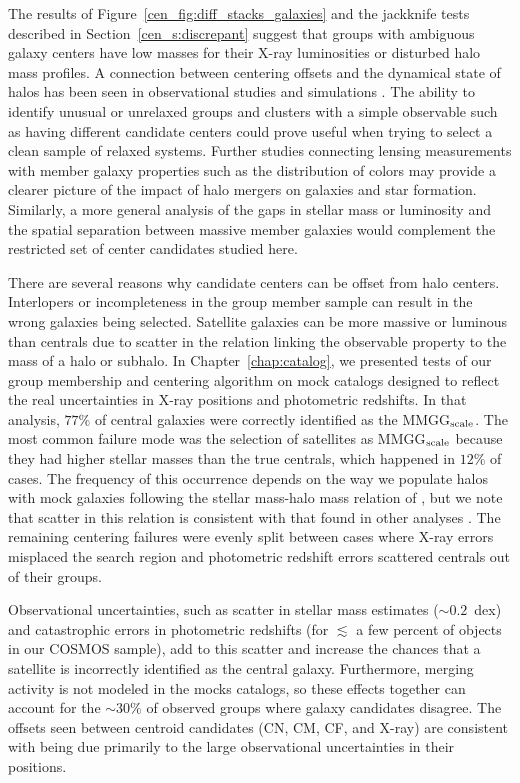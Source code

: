The results of Figure~\ref{cen_fig:diff_stacks_galaxies} and the jackknife
tests described in Section~\ref{cen_s:discrepant} suggest that groups with
ambiguous galaxy centers have low masses for their X-ray
  luminosities or disturbed halo mass profiles. A
connection between centering offsets and the dynamical state of halos
has been seen in observational studies \citep[e.g.,][]{Forman1982,
  Katayama2003, Sanderson2009} and simulations
\citep[e.g.,][]{Cohn2005, Poole2006, Maccio2007, Neto2007,
  SkibbaMaccio2011}. The ability to identify unusual
  or unrelaxed groups and
clusters with a simple observable such as having different candidate
centers could prove useful when trying to select a clean sample of
relaxed systems. Further studies connecting lensing measurements with
member galaxy properties such as the distribution of colors may
provide a clearer picture of the impact of halo mergers on galaxies
and star formation. Similarly, a more general analysis of the gaps in
stellar mass or luminosity and the spatial separation between massive
member galaxies would complement the restricted set of center
candidates studied here.

There are several reasons why candidate centers can be offset from
halo centers. Interlopers or incompleteness in the group member sample
can result in the wrong galaxies being selected. Satellite galaxies
can be more massive or luminous than centrals due to scatter in the
relation linking the observable property to the mass of a halo or
subhalo. In Chapter~\ref{chap:catalog}, we presented tests of our group membership and
centering algorithm on mock catalogs designed to reflect the real
uncertainties in X-ray positions and photometric redshifts. In that
analysis, $77\%$ of central galaxies were correctly identified as the
MMGG$_{\rm scale}$.  The most common failure mode was the selection of
satellites as MMGG$_{\rm scale}$ because they had higher stellar
masses than the true centrals, which happened in $12\%$ of
cases. The frequency of this occurrence depends on the
  way we populate halos with mock galaxies following the stellar
  mass-halo mass relation of \citet{Leauthaud2012}, but we note that
  scatter in this relation is consistent with that found in other
  analyses \citep{Yang2009, More2009, Reddick2012}. The remaining
centering failures were evenly split between cases where X-ray errors
misplaced the search region and photometric redshift errors scattered
centrals out of their groups.

Observational uncertainties, such as scatter in stellar mass estimates
($\sim0.2$~{\rm dex}) and catastrophic errors in photometric redshifts
(for $\lesssim$ a few percent of objects in our COSMOS sample), add to
this scatter and increase the chances that a satellite is incorrectly
identified as the central galaxy. Furthermore, merging activity is not
modeled in the mocks catalogs, so these effects together can account
for the $\sim30\%$ of observed groups where galaxy candidates
disagree. The offsets seen between centroid candidates (CN, CM, CF,
and X-ray) are consistent with being due primarily to the large
observational uncertainties in their positions.

